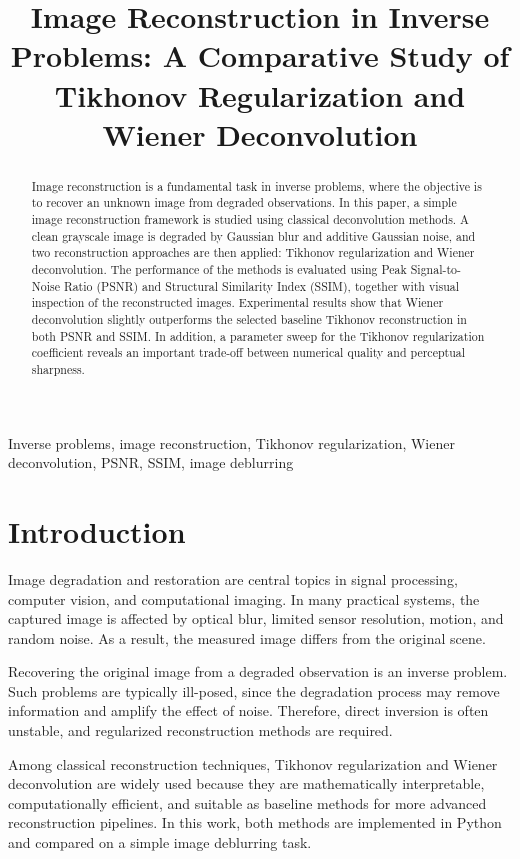 \documentclass[conference]{IEEEtran}
\title{Image Reconstruction in Inverse Problems: A Comparative Study of Tikhonov Regularization and Wiener Deconvolution}
\author{
	\IEEEauthorblockN{Mohammad Reza Shirkhan}
	\IEEEauthorblockA{
		M.Sc. in Electrical Engineering (Communication Systems)\\
		Email: r.shirkhan@gmail.com
	}
}
\begin{document}
	
	\maketitle
	
	\begin{abstract}
		Image reconstruction is a fundamental task in inverse problems, where the objective is to recover an unknown image from degraded observations. In this paper, a simple image reconstruction framework is studied using classical deconvolution methods. A clean grayscale image is degraded by Gaussian blur and additive Gaussian noise, and two reconstruction approaches are then applied: Tikhonov regularization and Wiener deconvolution. The performance of the methods is evaluated using Peak Signal-to-Noise Ratio (PSNR) and Structural Similarity Index (SSIM), together with visual inspection of the reconstructed images. Experimental results show that Wiener deconvolution slightly outperforms the selected baseline Tikhonov reconstruction in both PSNR and SSIM. In addition, a parameter sweep for the Tikhonov regularization coefficient reveals an important trade-off between numerical quality and perceptual sharpness.
	\end{abstract}
	
	\begin{IEEEkeywords}
		Inverse problems, image reconstruction, Tikhonov regularization, Wiener deconvolution, PSNR, SSIM, image deblurring
	\end{IEEEkeywords}
	
	\section{Introduction}
	Image degradation and restoration are central topics in signal processing, computer vision, and computational imaging. In many practical systems, the captured image is affected by optical blur, limited sensor resolution, motion, and random noise. As a result, the measured image differs from the original scene.
	
	Recovering the original image from a degraded observation is an inverse problem. Such problems are typically ill-posed, since the degradation process may remove information and amplify the effect of noise. Therefore, direct inversion is often unstable, and regularized reconstruction methods are required.
	
	Among classical reconstruction techniques, Tikhonov regularization and Wiener deconvolution are widely used because they are mathematically interpretable, computationally efficient, and suitable as baseline methods for more advanced reconstruction pipelines. In this work, both methods are implemented in Python and compared on a simple image deblurring task.
	
\end{document}
